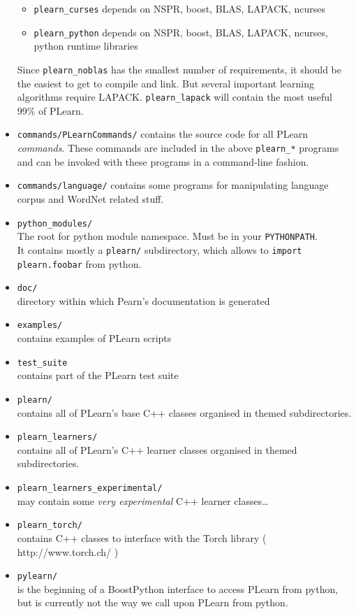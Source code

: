 \documentclass[11pt]{book}
\begin{document}
\begin{itemize}
\begin{itemize}
\item \verb!plearn_curses!   depends on NSPR, boost, BLAS, LAPACK, ncurses
\item \verb!plearn_python!   depends on NSPR, boost, BLAS, LAPACK, ncurses, python runtime libraries
\end{itemize}
Since \verb!plearn_noblas! has the smallest number of requirements, it should be the
easiest to get to compile and link. But several important learning algorithms require LAPACK. 
\verb!plearn_lapack! will contain the most useful 99\% of PLearn. 
\item \verb!commands/PLearnCommands/! contains the source code for all PLearn
{\em commands}. These commands are included in the above \verb!plearn_*!
programs and can be invoked with these programs in a command-line fashion.
\item \verb!commands/language/! contains some programs for manipulating language
corpus and WordNet related stuff.
\item \verb!python_modules/! \\
The root for python module namespace. Must be in your \verb!PYTHONPATH!. \\
It contains mostly a \verb!plearn/! subdirectory, which allows to \verb!import plearn.foobar! from python.
\item \verb!doc/! \\
directory within which Pearn's documentation is generated
\item \verb!examples/! \\
contains examples of PLearn scripts 
\item \verb!test_suite! \\
contains part of the PLearn test suite
\item \verb!plearn/! \\
contains all of PLearn's base C++ classes organised in themed subdirectories.
\item \verb!plearn_learners/! \\
contains all of PLearn's C++ learner classes organised in themed subdirectories.
\item \verb!plearn_learners_experimental/! \\
may contain some {\em very experimental} C++ learner classes\ldots
\item \verb!plearn_torch/! \\
contains C++ classes to interface with the Torch library ( http://www.torch.ch/ )
\item \verb!pylearn/! \\
is the beginning of a BoostPython interface to access PLearn from python,
but is currently not the way we call upon PLearn from python. 
\end{itemize}
\end{document}
